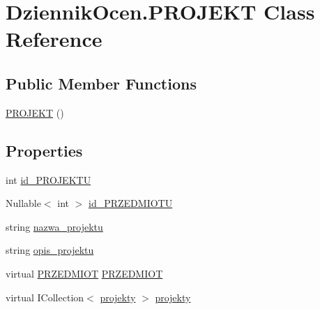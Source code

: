 \hypertarget{class_dziennik_ocen_1_1_p_r_o_j_e_k_t}{}\section{Dziennik\+Ocen.\+P\+R\+O\+J\+E\+KT Class Reference}
\label{class_dziennik_ocen_1_1_p_r_o_j_e_k_t}
\subsection*{Public Member Functions}
\begin{DoxyCompactItemize}
\item 
\hyperlink{class_dziennik_ocen_1_1_p_r_o_j_e_k_t_a3abcca87a153c4325f275329f0297179}{P\+R\+O\+J\+E\+KT} ()
\end{DoxyCompactItemize}
\subsection*{Properties}
\begin{DoxyCompactItemize}
\item 
int \hyperlink{class_dziennik_ocen_1_1_p_r_o_j_e_k_t_a10dfcac5d5e5ebc43aa6babc9dbf8e43}{id\+\_\+\+P\+R\+O\+J\+E\+K\+TU}
\item 
Nullable$<$ int $>$ \hyperlink{class_dziennik_ocen_1_1_p_r_o_j_e_k_t_a10e76feb30b721c77741297e110d6687}{id\+\_\+\+P\+R\+Z\+E\+D\+M\+I\+O\+TU}
\item 
string \hyperlink{class_dziennik_ocen_1_1_p_r_o_j_e_k_t_a6e4c6ed50a631ec15d357412547a2543}{nazwa\+\_\+projektu}
\item 
string \hyperlink{class_dziennik_ocen_1_1_p_r_o_j_e_k_t_aa8f12b7512f62a59ffc2ad627d3f2964}{opis\+\_\+projektu}
\item 
virtual \hyperlink{class_dziennik_ocen_1_1_p_r_z_e_d_m_i_o_t}{P\+R\+Z\+E\+D\+M\+I\+OT} \hyperlink{class_dziennik_ocen_1_1_p_r_o_j_e_k_t_a4ed65111634cf5bde9380fbfb01a6078}{P\+R\+Z\+E\+D\+M\+I\+OT}
\item 
virtual I\+Collection$<$ \hyperlink{class_dziennik_ocen_1_1projekty}{projekty} $>$ \hyperlink{class_dziennik_ocen_1_1_p_r_o_j_e_k_t_a29bd29f7fbc160cee12a91203574dd6f}{projekty}
\end{DoxyCompactItemize}


